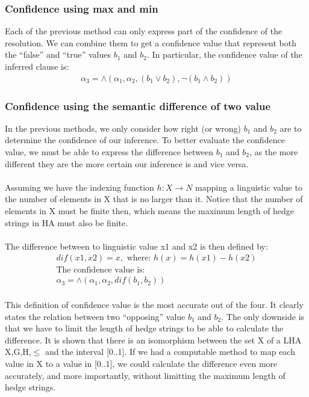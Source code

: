 \documentclass[26pt,fleqn,]{article}
\begin{document}
\subsubsection{Confidence using max and min}
Each of the previous method can only express part of the confidence of the resolution. We can combine
them to get a confidence value that represent both the ``false'' and ``true'' values \(b_1\) and 
\(b_2\). In particular, the confidence value of the inferred clause is:
\begin{align*}
	{\alpha}_3 = \wedge({\alpha}_1, {\alpha}_2, (b_1 \vee b_2), \neg(b_1 \wedge b_2))
\end{align*}
\subsubsection{Confidence using the semantic difference of two value}
In the previous methods, we only consider how right (or wrong) \(b_1\) and \(b_2\) are to determine
the confidence of our inference. To better evaluate the confidence value, we must be able to express
the difference between \(b_1\) and \(b_2\), as the more different they are the more certain our 
inference is and vice versa.\\
\\
Assuming we have the indexing function \(h: X \to N\) mapping a linguistic value to the number of 
elements in X that is no larger than it. Notice that the number of elements in X must be finite then, 
which means the maximum length of hedge strings in HA must also be finite.\\ 
\\
The difference between to linguistic value x1 and x2 is then defined by:
\begin{align*}
	dif(x1,x2) = x, \text{ where: } h(x) = h(x1) - h(x2)\\
	\text{The confidence value is:}\\
	\alpha_3 = \wedge(\alpha_1,\alpha_2,dif(b_1,b_2))
\end{align*}
\\
This definition of confidence value is the most accurate out of the four. It clearly states the relation
between two ``opposing'' value \(b_1\) and \(b_2\). The only downside is that we have to limit the 
length of hedge strings to be able to calculate the difference. It is shown that there is an 
isomorphism between the set X of a LHA {X,G,H,\(\le\)} and the interval [0..1]. If we had a computable
method to map each value in X to a value in [0..1], we could calculate the difference even more 
accurately, and more importantly, without limitting the maximum length of hedge strings.\\
\end{document}
